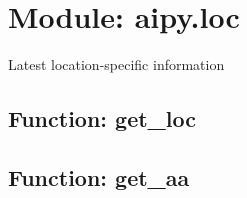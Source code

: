 \section{Module: aipy.loc}

Latest location-specific information

\subsection{Function: get\_loc}

\subsection{Function: get\_aa}


